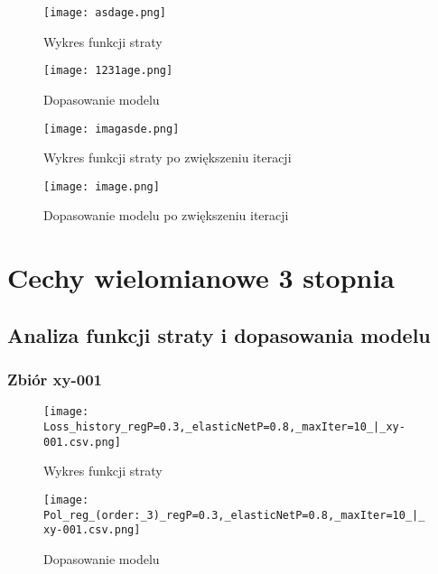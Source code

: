 \documentclass{article}
\begin{document}
\begin{figure}[H]
    \centering
    \begin{minipage}{0.45\textwidth}
        \texttt{[image: asdage.png]}
        \caption{Wykres funkcji straty}
    \end{minipage}
    \hfill
    \begin{minipage}{0.45\textwidth}
        \texttt{[image: 1231age.png]}
        \caption{Dopasowanie modelu}
    \end{minipage}
\end{figure}

\begin{figure}[H]
    \centering
    \begin{minipage}{0.45\textwidth}
        \texttt{[image: imagasde.png]}
        \caption{Wykres funkcji straty po zwiększeniu iteracji}
    \end{minipage}
    \hfill
    \begin{minipage}{0.45\textwidth}
        \texttt{[image: image.png]}
        \caption{Dopasowanie modelu po zwiększeniu iteracji}
    \end{minipage}
\end{figure}

\section{Cechy wielomianowe 3 stopnia}

\subsection{Analiza funkcji straty i dopasowania modelu}
\subsubsection{Zbiór xy-001}
\begin{figure}[H]
    \centering
    \begin{minipage}{0.45\textwidth}
        \texttt{[image: Loss\_history\_regP=0.3,\_elasticNetP=0.8,\_maxIter=10\_|\_xy-001.csv.png]}
        \caption{Wykres funkcji straty}
    \end{minipage}
    \hfill
    \begin{minipage}{0.45\textwidth}
        \texttt{[image: Pol\_reg\_(order:\_3)\_regP=0.3,\_elasticNetP=0.8,\_maxIter=10\_|\_xy-001.csv.png]}
        \caption{Dopasowanie modelu}
    \end{minipage}
\end{figure}
\end{document}
